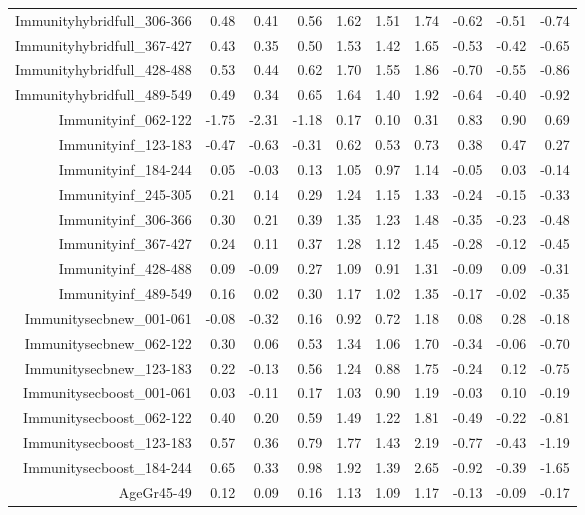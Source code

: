 \begin{table}[ht]
\begin{tabular}{rrrrrrrrrr}
  Immunityhybridfull\_306-366 & 0.48 & 0.41 & 0.56 & 1.62 & 1.51 & 1.74 & -0.62 & -0.51 & -0.74 \\ 
  Immunityhybridfull\_367-427 & 0.43 & 0.35 & 0.50 & 1.53 & 1.42 & 1.65 & -0.53 & -0.42 & -0.65 \\ 
  Immunityhybridfull\_428-488 & 0.53 & 0.44 & 0.62 & 1.70 & 1.55 & 1.86 & -0.70 & -0.55 & -0.86 \\ 
  Immunityhybridfull\_489-549 & 0.49 & 0.34 & 0.65 & 1.64 & 1.40 & 1.92 & -0.64 & -0.40 & -0.92 \\ 
  Immunityinf\_062-122 & -1.75 & -2.31 & -1.18 & 0.17 & 0.10 & 0.31 & 0.83 & 0.90 & 0.69 \\ 
  Immunityinf\_123-183 & -0.47 & -0.63 & -0.31 & 0.62 & 0.53 & 0.73 & 0.38 & 0.47 & 0.27 \\ 
  Immunityinf\_184-244 & 0.05 & -0.03 & 0.13 & 1.05 & 0.97 & 1.14 & -0.05 & 0.03 & -0.14 \\ 
  Immunityinf\_245-305 & 0.21 & 0.14 & 0.29 & 1.24 & 1.15 & 1.33 & -0.24 & -0.15 & -0.33 \\ 
  Immunityinf\_306-366 & 0.30 & 0.21 & 0.39 & 1.35 & 1.23 & 1.48 & -0.35 & -0.23 & -0.48 \\ 
  Immunityinf\_367-427 & 0.24 & 0.11 & 0.37 & 1.28 & 1.12 & 1.45 & -0.28 & -0.12 & -0.45 \\ 
  Immunityinf\_428-488 & 0.09 & -0.09 & 0.27 & 1.09 & 0.91 & 1.31 & -0.09 & 0.09 & -0.31 \\ 
  Immunityinf\_489-549 & 0.16 & 0.02 & 0.30 & 1.17 & 1.02 & 1.35 & -0.17 & -0.02 & -0.35 \\ 
  Immunitysecbnew\_001-061 & -0.08 & -0.32 & 0.16 & 0.92 & 0.72 & 1.18 & 0.08 & 0.28 & -0.18 \\ 
  Immunitysecbnew\_062-122 & 0.30 & 0.06 & 0.53 & 1.34 & 1.06 & 1.70 & -0.34 & -0.06 & -0.70 \\ 
  Immunitysecbnew\_123-183 & 0.22 & -0.13 & 0.56 & 1.24 & 0.88 & 1.75 & -0.24 & 0.12 & -0.75 \\ 
  Immunitysecboost\_001-061 & 0.03 & -0.11 & 0.17 & 1.03 & 0.90 & 1.19 & -0.03 & 0.10 & -0.19 \\ 
  Immunitysecboost\_062-122 & 0.40 & 0.20 & 0.59 & 1.49 & 1.22 & 1.81 & -0.49 & -0.22 & -0.81 \\ 
  Immunitysecboost\_123-183 & 0.57 & 0.36 & 0.79 & 1.77 & 1.43 & 2.19 & -0.77 & -0.43 & -1.19 \\ 
  Immunitysecboost\_184-244 & 0.65 & 0.33 & 0.98 & 1.92 & 1.39 & 2.65 & -0.92 & -0.39 & -1.65 \\ 
  AgeGr45-49 & 0.12 & 0.09 & 0.16 & 1.13 & 1.09 & 1.17 & -0.13 & -0.09 & -0.17 \\ 

\end{tabular}
\end{table}

